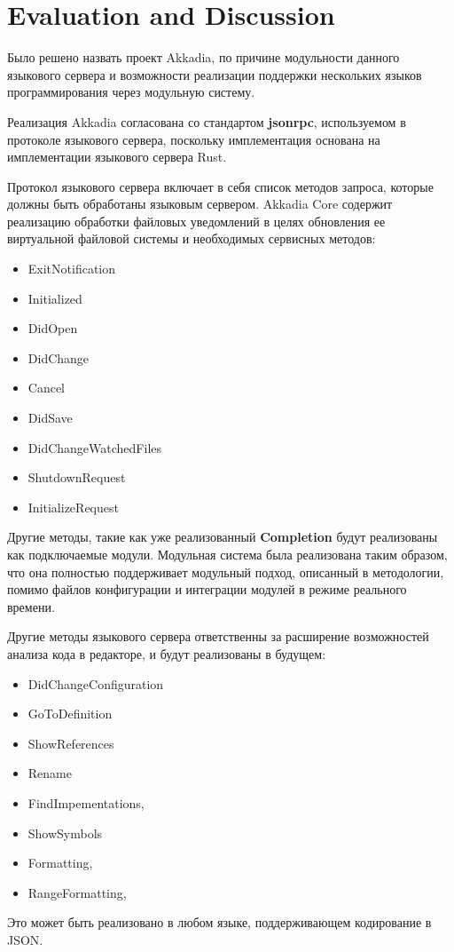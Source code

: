 \chapter{Evaluation and Discussion}
\label{chap:eval}

Было решено назвать проект Akkadia, по причине модульности данного языкового сервера и возможности реализации поддержки нескольких языков программирования через модульную систему.

Реализация Akkadia согласована со стандартом \textbf{jsonrpc}, используемом в протоколе языкового сервера, поскольку имплементация основана на имплементации языкового сервера Rust.

Протокол языкового сервера включает в себя список методов запроса, которые должны быть обработаны языковым сервером. Akkadia Core содержит реализацию обработки файловых уведомлений в целях обновления ее виртуальной файловой системы и необходимых сервисных методов:
\begin{itemize}
\item ExitNotification
\item Initialized
\item DidOpen
\item DidChange
\item Cancel
\item DidSave
\item DidChangeWatchedFiles
\item ShutdownRequest
\item InitializeRequest
\end{itemize}

Другие методы, такие как уже реализованный \textbf{Completion} будут реализованы как подключаемые модули. Модульная система была реализована таким образом, что она полностью поддерживает модульный подход, описанный в методологии, помимо файлов конфигурации и интеграции модулей в режиме реального времени.

Другие методы языкового сервера ответственны за расширение возможностей анализа кода в редакторе, и будут реализованы в будущем:
\begin{itemize}
\item DidChangeConfiguration
\item GoToDefinition
\item ShowReferences
\item Rename
\item FindImpementations,
\item ShowSymbols
\item Formatting,
\item RangeFormatting,
\end{itemize}
Это может быть реализовано в любом языке, поддерживающем кодирование в JSON.

